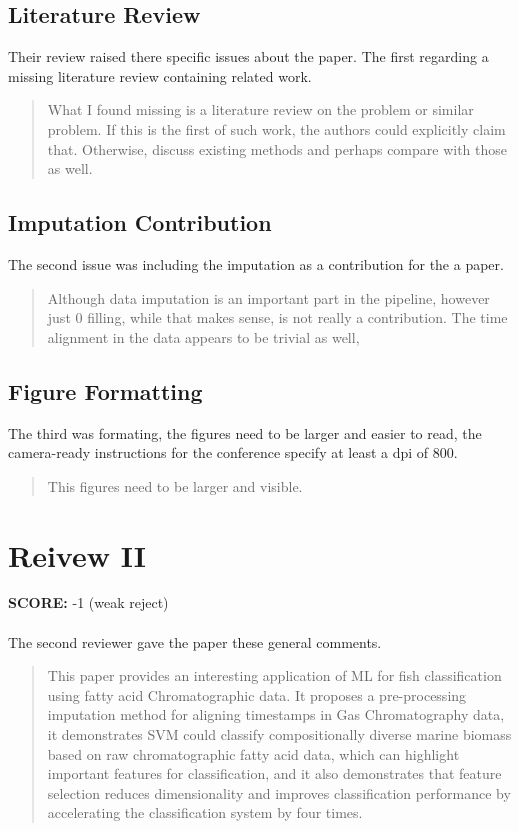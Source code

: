 \documentclass[runningheads]{llncs}
\begin{document}
\subsection{Literature Review}

Their review raised there specific issues about the paper. The first regarding a missing literature review containing related work. 

\begin{quote}
  What I found missing is a literature review on the problem or similar problem. If this is the first of such work, the authors could explicitly claim that. Otherwise, discuss existing methods and perhaps compare with those as well.
\end{quote}

\subsection{Imputation Contribution}

The second issue was including the imputation as a contribution for the a paper. 

\begin{quote}
  Although data imputation is an important part in the pipeline, however just 0 filling, while that makes sense, is not really a contribution. The time alignment in the data appears to be trivial as well,
\end{quote}

\subsection{Figure Formatting}

The third was formating, the figures need to be larger and easier to read, the camera-ready instructions for the conference specify at least a dpi of 800.

\begin{quote}
  This figures need to be larger and visible.
\end{quote} 

\section{Reivew II}

\textbf{SCORE:} -1 (weak reject)
\\\\
The second reviewer gave the paper these general comments. 

\begin{quote}
  This paper provides an interesting application of ML for fish classification using fatty acid Chromatographic data. It proposes a pre-processing imputation method for aligning timestamps in Gas Chromatography data, it demonstrates SVM could classify compositionally diverse marine biomass based on raw chromatographic fatty acid data, which can highlight important features for classification, and it also demonstrates that feature selection reduces dimensionality and improves classification performance by accelerating the classification system by four times.
\end{quote}
\end{document}
